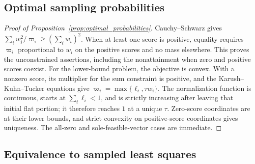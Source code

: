 \documentclass[pdflatex,iicol,sn-mathphys-ay]{sn-jnl}
\theoremstyle{thmstyleone}
\theoremstyle{thmstylethree}
\theoremstyle{thmstyletwo}
\begin{document}
\subsection{Optimal sampling probabilities}
\label{app:proof-optimal-probabilities}

\begin{proof}[Proof of Proposition~{\upshape\ref{prop:optimal_probabilities}}]
Cauchy--Schwarz gives
$\sum_i w_i^2/\varpi_i\ge(\sum_iw_i)^2$. When at least one score is
positive, equality requires
$\varpi_i$ proportional to $w_i$ on the positive scores and no mass
elsewhere. This proves the unconstrained assertions, including the
nonattainment when zero and positive scores coexist.
For the lower-bound problem, the objective is convex. With a nonzero
score, its multiplier for the sum constraint is positive, and the
Karush--Kuhn--Tucker equations give $\varpi_i=\max\{\ell_i,\tau w_i\}$.
The normalization function is continuous, starts at $\sum_i\ell_i<1$,
and is strictly increasing after leaving that initial flat portion;
it therefore reaches $1$ at a unique $\tau$. Zero-score coordinates
are at their lower bounds, and strict convexity on positive-score
coordinates gives uniqueness. The all-zero and sole-feasible-vector
cases are immediate.
\end{proof}

\subsection{Equivalence to sampled least squares}
\label{app:proof-ls-equivalence}
\end{document}
